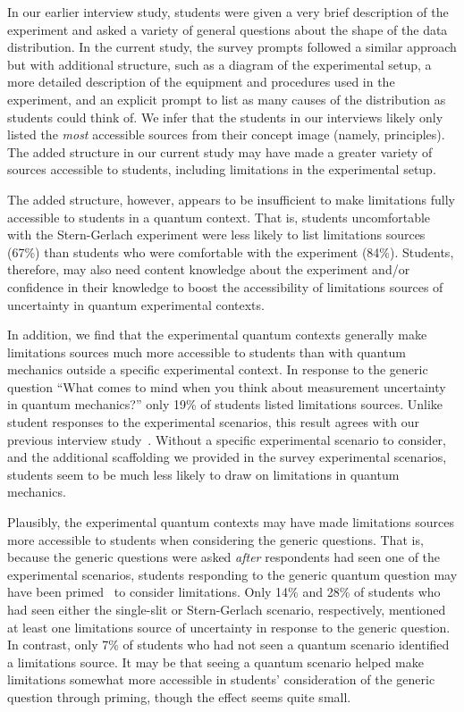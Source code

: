 \documentclass[english,aps,prstper,reprint,showpacs,longbibliography,superscriptaddress,nofootinbib]{revtex4-2}
\begin{document}
In our earlier interview study, students were given a very brief description of the experiment and asked a variety of general questions about the shape of the data distribution. In the current study, the survey prompts followed a similar approach but with additional structure, such as a diagram of the experimental setup, a more detailed description of the equipment and procedures used in the experiment, and an explicit prompt to list as many causes of the distribution as students could think of. We infer that the students in our interviews likely only listed the \emph{most} accessible sources from their concept image (namely, principles). The added structure in our current study may have made a greater variety of sources accessible to students, including limitations in the experimental setup.

The added structure, however, appears to be insufficient to make limitations fully accessible to students in a quantum context. That is, students uncomfortable with the Stern-Gerlach experiment were less likely to list limitations sources (67\%) than students who were comfortable with the experiment (84\%). Students, therefore, may also need content knowledge about the experiment and/or confidence in their knowledge to boost the accessibility of limitations sources of uncertainty in quantum experimental contexts.

In addition, we find that the experimental quantum contexts generally make limitations sources much more accessible to students than with quantum mechanics outside a specific experimental context. In response to the generic question ``What comes to mind when you think about measurement uncertainty in quantum mechanics?'' only 19\% of students listed limitations sources. Unlike student responses to the experimental scenarios, this result agrees with our previous interview study~\cite{Stein2019,Stump2020}.
Without a specific experimental scenario to consider, and the additional scaffolding we provided in the survey experimental scenarios, students seem to be much less likely to draw on limitations in quantum mechanics.

Plausibly, the experimental quantum contexts may have made limitations sources more accessible to students when considering the generic questions. That is, because the generic questions were asked \emph{after} respondents had seen one of the experimental scenarios, students responding to the generic quantum question may have been primed~\cite{Iyengar1987,Price1997} to consider limitations. Only 14\% and 28\% of students who had seen either the single-slit or Stern-Gerlach scenario, respectively, mentioned at least one limitations source of uncertainty in response to the generic question. In contrast, only 7\% of students who had not seen a quantum scenario identified a limitations source. It may be that seeing a quantum scenario helped make limitations somewhat more accessible in students' consideration of the generic question through priming, though the effect seems quite small. %
\end{document}
